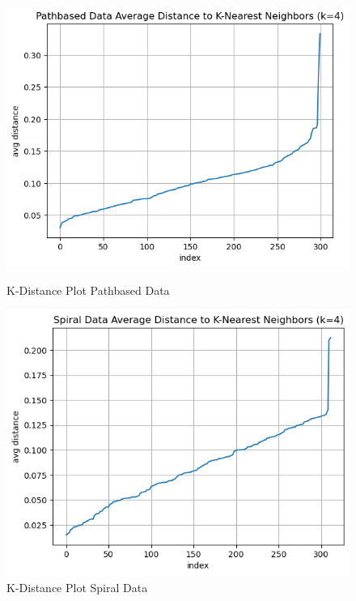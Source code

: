 \documentclass{article}
\begin{document}
\begin{figure}[H]
    \centering
    \begin{minipage}[b]{0.49\textwidth}
        \centering
        \includegraphics[width=\textwidth]{k_dist_pathbased.png}
        \caption{K-Distance Plot Pathbased Data}
    \end{minipage}
    \hfill
    \begin{minipage}[b]{0.49\textwidth}
        \centering
        \includegraphics[width=\textwidth]{k_dist_spiral.png}
        \caption{K-Distance Plot Spiral Data}
    \end{minipage}
\end{figure}
\end{document}

